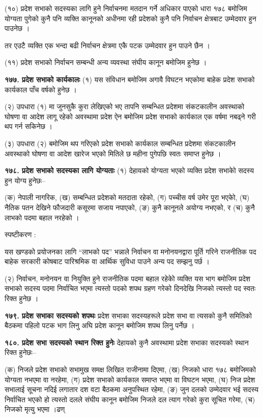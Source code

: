 (१०) प्रदेश सभाको सदस्यका लागि हुने निर्वाचनमा मतदान गर्ने अधिकार पाएको धारा १७८ बमोजिम योग्यता पुगेको कुनै पनि व्यक्ति
कानूनको अधीनमा रही प्रदेशको कुनै पनि निर्वाचन क्षेत्रबाट उम्मेदवार हुन पाउनेछ ।

तर एउटै व्यक्ति एक भन्दा बढी निर्वाचन क्षेत्रमा एकै पटक उम्मेदवार हुन पाउने छैन ।

(११) प्रदेश सभाको निर्वाचन सम्बन्धी अन्य व्यवस्था संघीय कानून बमोजिम हुनेछ ।

\textbf{१७७. प्रदेश सभाको कार्यकालः} (१) यस संविधान बमोजिम अगावै विघटन भएकोमा बाहेक प्रदेश सभाको कार्यकाल पाँच वर्षको हुनेछ ।

(२) उपधारा (१) मा जुनसुकै कुरा लेखिएको भए तापनि सम्बन्धित प्रदेशमा संकटकालीन अवस्थाको घोषणा वा आदेश लागू रहेको अवस्थामा प्रदेश ऐन बमोजिम प्रदेश सभाको कार्यकाल एक वर्षमा नबढ्ने गरी थप गर्न सकिनेछ ।

(३) उपधारा (२) बमोजिम थप गरिएको प्रदेश सभाको कार्यकाल सम्बन्धित प्रदेशमा संकटकालीन अवस्थाको घोषणा वा आदेश खारेज भएको मितिले छ महीना पुगेपछि स्वतः समाप्त हुनेछ ।

\textbf{१७८. प्रदेश सभाको सदस्यका लागि योग्यताः} (१) देहायको योग्यता भएको व्यक्ति प्रदेश सभाकोे सदस्य हुन योग्य हुनेछः–

(क) नेपाली नागरिक,
(ख) सम्बन्धित प्रदेशको मतदाता रहेको,
(ग) पच्चीस वर्ष उमेर पूरा भएकोे,
(घ) नैतिक पतन देखिने फौजदारी कसूरमा सजाय नपाएको,
(ङ) कुनै कानूनले अयोग्य नभएको, र
(च) कुनै लाभको पदमा बहाल नरहेको ।

स्पष्टीकरण :

यस खण्डको प्रयोजनका लागि “लाभको पद” भन्नाले निर्वाचन वा मनोनयनद्वारा पूर्ति गरिने राजनीतिक पद बाहेक सरकारी कोषबाट पारिश्रमिक वा आर्थिक सुविधा पाउने अन्य पद सम्झनु पर्छ ।

(२) निर्वाचन, मनोनयन वा नियुक्ति हुने राजनीतिक पदमा बहाल रहेकोे व्यक्ति यस भाग बमोजिम प्रदेश सभाको सदस्य पदमा निर्वाचित
भएमा त्यस्तो पदको शपथ ग्रहण गरेको दिनदेखि निजको त्यस्तो पद स्वतः रिक्त हुनेछ ।

\textbf{१७९. प्रदेश सभाका सदस्यको शपथः} प्रदेश सभाका सदस्यहरूले प्रदेश सभा वा त्यसको कुनै समितिको बैठकमा पहिलो पटक भाग लिनु अघि प्रदेश कानून बमोजिम शपथ लिनु पर्नेछ ।

\textbf{१८०. प्रदेश सभा सदस्यको स्थान रिक्त हुनेः} देहायको कुनै अवस्थामा प्रदेश सभाका सदस्यको स्थान रिक्त हुनेछः–

(क) निजले प्रदेश सभाको सभामुख समक्ष लिखित राजीनामा दिएमा,
(ख) निजको धारा १७८ बमोजिमको योग्यता नभएमा वा नरहेमा,
(ग) प्रदेश सभाको कार्यकाल समाप्त भएमा वा विघटन भएमा,
(घ) निज प्रदेश सभालाई सूचना नदिई लगातार दश वटा बैठकमा अनुपस्थित रहेमा,
(ङ) जुन दलको उम्मेदवार भई सदस्य निर्वाचित भएको हो त्यस्तो दलले संघीय कानून बमोजिम निजले दल त्याग गरेको कुरा सूचित गरेमा,
(च) निजको मृत्यु भएमा ।ढण्

